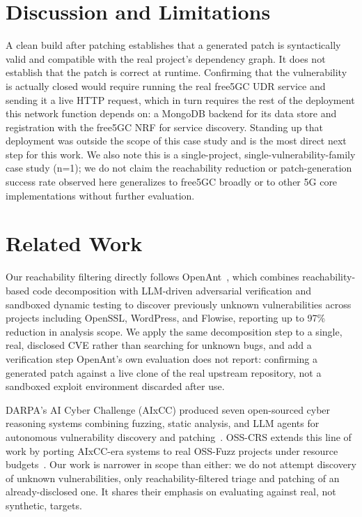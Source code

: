 \documentclass[sigconf]{acmart}
\begin{document}
\section{Discussion and Limitations}

A clean build after patching establishes that a generated patch is
syntactically valid and compatible with the real project's dependency
graph. It does not establish that the patch is correct at runtime.
Confirming that the vulnerability is actually closed would require
running the real free5GC UDR service and sending it a live HTTP
request, which in turn requires the rest of the deployment this network
function depends on: a MongoDB backend for its data store and
registration with the free5GC NRF for service discovery. Standing up
that deployment was outside the scope of this case study and is the
most direct next step for this work. We also note this is a
single-project, single-vulnerability-family case study (n=1); we do not
claim the reachability reduction or patch-generation success rate
observed here generalizes to free5GC broadly or to other 5G core
implementations without further evaluation.

\section{Related Work}

Our reachability filtering directly follows OpenAnt~\cite{openant},
which combines reachability-based code decomposition with LLM-driven
adversarial verification and sandboxed dynamic testing to discover
previously unknown vulnerabilities across projects including OpenSSL,
WordPress, and Flowise, reporting up to 97\% reduction in analysis
scope. We apply the same decomposition step to a single, real,
disclosed CVE rather than searching for unknown bugs, and add a
verification step OpenAnt's own evaluation does not report: confirming
a generated patch against a live clone of the real upstream repository,
not a sandboxed exploit environment discarded after use.

DARPA's AI Cyber Challenge (AIxCC) produced seven open-sourced cyber
reasoning systems combining fuzzing, static analysis, and LLM agents
for autonomous vulnerability discovery and patching~\cite{aixcc}.
OSS-CRS extends this line of work by porting AIxCC-era systems to real
OSS-Fuzz projects under resource budgets~\cite{osscrs}. Our work is
narrower in scope than either: we do not attempt discovery of unknown
vulnerabilities, only reachability-filtered triage and patching of an
already-disclosed one. It shares their emphasis on evaluating
against real, not synthetic, targets.
\end{document}
